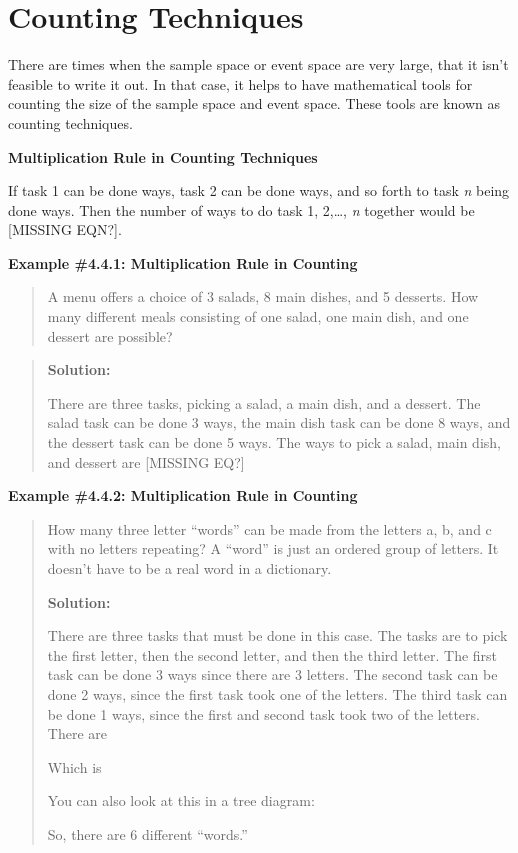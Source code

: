 \documentclass[]{book}
\begin{document}
\hypertarget{counting-techniques}{%
\section{Counting Techniques}\label{counting-techniques}}

There are times when the sample space or event space are very large, that it isn't feasible to write it out. In that case, it helps to have mathematical tools for counting the size of the sample space and event space. These tools are known as counting techniques.

\textbf{Multiplication Rule in Counting Techniques}

If task 1 can be done ways, task 2 can be done ways, and so forth to task \emph{n} being done ways. Then the number of ways to do task 1, 2,\ldots{}, \emph{n} together would be {[}MISSING EQN?{]}.

\textbf{Example \#4.4.1: Multiplication Rule in Counting}

\begin{quote}
A menu offers a choice of 3 salads, 8 main dishes, and 5 desserts. How many different meals consisting of one salad, one main dish, and one dessert are possible?
\end{quote}

\begin{quote}
\textbf{Solution:}

There are three tasks, picking a salad, a main dish, and a dessert. The salad task can be done 3 ways, the main dish task can be done 8 ways, and the dessert task can be done 5 ways. The ways to pick a salad, main dish, and dessert are {[}MISSING EQ?{]}
\end{quote}

\textbf{Example \#4.4.2: Multiplication Rule in Counting}

\begin{quote}
How many three letter ``words'' can be made from the letters a, b, and c
with no letters repeating? A ``word'' is just an ordered group of
letters. It doesn't have to be a real word in a dictionary.

\textbf{Solution:}

There are three tasks that must be done in this case. The tasks are to
pick the first letter, then the second letter, and then the third
letter. The first task can be done 3 ways since there are 3 letters.
The second task can be done 2 ways, since the first task took one of
the letters. The third task can be done 1 ways, since the first and
second task took two of the letters. There are

Which is

You can also look at this in a tree diagram:

So, there are 6 different ``words.''
\end{quote}
\end{document}

